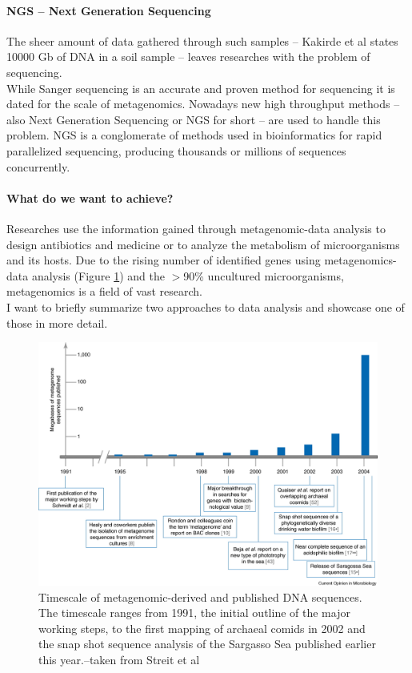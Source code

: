 \documentclass[twocolumn]{bmcart}%
\begin{document}
\paragraph*{NGS -- Next Generation Sequencing}
The sheer amount of data gathered through such samples -- Kakirde et al\cite{KAKIRDE20101911} states 10000 Gb of DNA in a soil sample -- leaves researches with the problem of sequencing.\\
While Sanger sequencing is an accurate and proven method for sequencing it is dated for the scale of metagenomics. Nowadays new high throughput methods -- also Next Generation Sequencing or NGS for short -- are used to handle this problem. NGS is a conglomerate of methods used in bioinformatics  for rapid parallelized sequencing, producing thousands or millions of sequences concurrently.
\paragraph*{What do we want to achieve?}
Researches use the information gained through metagenomic-data analysis to design antibiotics and medicine or to analyze the metabolism of microorganisms and its hosts. Due to the rising number of identified genes using metagenomics-data analysis (Figure \ref{img:nov_gene_discov}) and the  $>$90\% uncultured microorganisms, metagenomics is a field of vast research.\\
 I want to briefly summarize two approaches to data analysis and showcase one of those in more detail.
\begin{figure}
	\centering
\includegraphics[width=.9\linewidth]{bilder/growth_of_novel_gene_discovery.jpg}	
\caption{Timescale of metagenomic-derived and published DNA sequences. The timescale ranges from 1991, the initial outline of the major working steps, to the first mapping of archaeal comids in 2002 and the snap shot sequence analysis of the Sargasso Sea published earlier this year.--taken from Streit et al \cite{STREIT2004492}}
\label{img:nov_gene_discov}
\end{figure}
\end{document}
